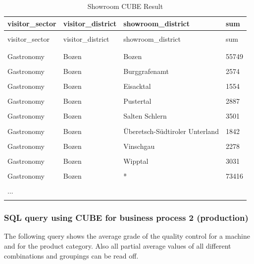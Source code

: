 \documentclass[letterpaper,12pt]{article}
\begin{document}
\begingroup
\renewcommand\arraystretch{0.5}
\begin{longtable}{p{4cm}p{4cm}p{3cm}p{2cm}}
        \caption{Showroom CUBE Result} \\
	visitor\_sector & visitor\_district & showroom\_district & sum \\
        \endfirsthead \\
        visitor\_sector & visitor\_district & showroom\_district & sum \\
        \endhead \\
        \hline \\
        Gastronomy & Bozen & Bozen & 55749 \\
        \hline \\
        Gastronomy & Bozen & Burggrafenamt  & 2574 \\
        \hline \\
        Gastronomy & Bozen & Eisacktal & 1554 \\
        \hline \\
        Gastronomy & Bozen & Pustertal & 2887 \\
        \hline \\
        Gastronomy & Bozen & Salten Schlern & 3501 \\
        \hline \\
        Gastronomy & Bozen & Überetsch-Südtiroler Unterland & 1842 \\
        \hline \\
        Gastronomy & Bozen & Vinschgau & 2278 \\
        \hline \\
        Gastronomy & Bozen & Wipptal & 3031 \\
        \hline \\
        Gastronomy & Bozen & * & 73416 \\
        \hline \\
        ... \\
        \hline \\
\end{longtable} 
\endgroup    

\subsubsection{SQL query using CUBE for business process 2 (production)}

The following query shows the average grade of the quality control for a machine and for the product category. Also all partial average values of all different combinations and groupings can be read off.
\end{document}
